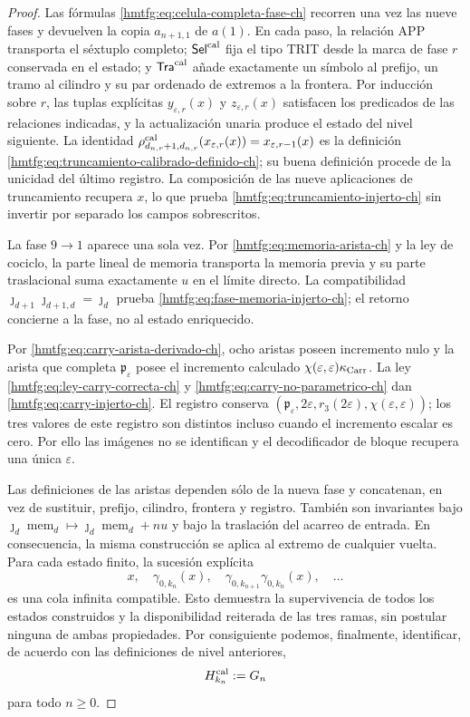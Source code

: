 \begin{proof}
Las fórmulas \eqref{hmtfg:eq:celula-completa-fase-ch} recorren una vez las nueve
fases y devuelven la copia \(a_{n+1,1}\) de \(a(1)\). En cada paso, la relación APP transporta el
séxtuplo completo; \(\mathsf{Sel}^{\rm cal}\) fija el tipo TRIT desde la marca de fase
\(r\) conservada en el estado;
y \(\mathsf{Tra}^{\rm cal}\) añade exactamente un símbolo al prefijo, un tramo al
cilindro y su par ordenado de extremos a la frontera. Por inducción sobre
\(r\), las tuplas explícitas \(y_{\varepsilon,r}(x)\) y
\(z_{\varepsilon,r}(x)\) satisfacen los predicados de las relaciones
indicadas, y la actualización unaria produce el estado del nivel siguiente.
La identidad
\(\rho^{\rm cal}_{d_{n,r}+1,d_{n,r}}
(x_{\varepsilon,r}(x))=x_{\varepsilon,r-1}(x)\) es la definición
\eqref{hmtfg:eq:truncamiento-calibrado-definido-ch}; su buena definición procede de
la unicidad del último registro. La composición de las nueve aplicaciones de
truncamiento recupera \(x\), lo que prueba
\eqref{hmtfg:eq:truncamiento-injerto-ch} sin invertir por separado los campos
sobrescritos.

La fase \(9\to1\) aparece una sola vez. Por
\eqref{hmtfg:eq:memoria-arista-ch} y la ley de cociclo, la parte lineal de memoria
transporta la memoria previa y su parte traslacional suma exactamente \(u\)
en el límite directo. La compatibilidad
\(\jmath_{d+1}\jmath_{d+1,d}=\jmath_d\) prueba
\eqref{hmtfg:eq:fase-memoria-injerto-ch}; el retorno concierne a la fase, no al
estado enriquecido.

Por \eqref{hmtfg:eq:carry-arista-derivado-ch}, ocho aristas poseen incremento nulo y
la arista que completa \(\mathfrak p_\varepsilon\) posee el incremento calculado
\(\chi(\varepsilon,\varepsilon)\kappa_{\rm Carr}\). La ley
\eqref{hmtfg:eq:ley-carry-correcta-ch} y
\eqref{hmtfg:eq:carry-no-parametrico-ch} dan
\eqref{hmtfg:eq:carry-injerto-ch}. El registro conserva
\((\mathfrak p_\varepsilon,2\varepsilon,r_3(2\varepsilon),
\chi(\varepsilon,\varepsilon))\); los tres valores de este registro son
distintos incluso cuando el incremento escalar es cero. Por ello las imágenes
no se identifican y el decodificador de bloque recupera una única
\(\varepsilon\).

Las definiciones de las aristas dependen sólo de la nueva fase y concatenan,
en vez de sustituir, prefijo, cilindro, frontera y registro. También son
invariantes bajo
\(\jmath_d\operatorname{mem}_d\mapsto
  \jmath_d\operatorname{mem}_d+nu\)
y bajo la traslación del acarreo de
entrada. En consecuencia, la misma construcción se aplica al extremo de
cualquier vuelta. Para cada estado finito, la sucesión explícita
\[
 x,\quad\gamma_{0,k_n}(x),\quad
 \gamma_{0,k_{n+1}}\gamma_{0,k_n}(x),\quad\ldots
\]
es una cola infinita compatible. Esto demuestra la supervivencia de todos los
estados construidos y la disponibilidad reiterada de las tres ramas, sin
postular ninguna de ambas propiedades. Por consiguiente podemos, finalmente,
identificar, de acuerdo con las definiciones de nivel anteriores,
\begin{equation}
 H_{k_n}^{\rm cal}:=G_n
 \label{hmtfg:eq:subarbol-calibrado-superviviente-ch}
\end{equation}
para todo \(n\ge0\).
\end{proof}

